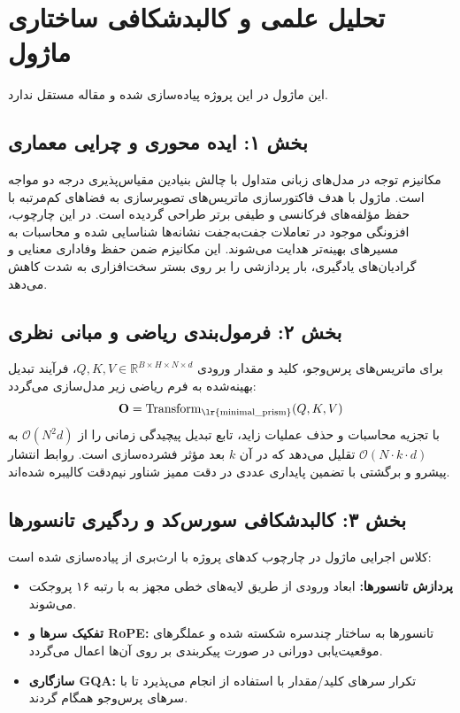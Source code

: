 \section{تحلیل علمی و کالبدشکافی ساختاری ماژول }

این ماژول در این پروژه پیاده‌سازی شده و مقاله مستقل ندارد.
\label{sec:minimal_prism}

\subsection*{بخش ۱: ایده محوری و چرایی معماری }
مکانیزم توجه در مدل‌های زبانی متداول با چالش بنیادین مقیاس‌پذیری درجه دو مواجه است. ماژول  با هدف فاکتورسازی ماتریس‌های تصویرسازی به فضاهای کم‌مرتبه با حفظ مؤلفه‌های فرکانسی و طیفی برتر طراحی گردیده است. در این چارچوب، افزونگی موجود در تعاملات جفت‌به‌جفت نشانه‌ها شناسایی شده و محاسبات به مسیرهای بهینه‌تر هدایت می‌شوند. این مکانیزم ضمن حفظ وفاداری معنایی و گرادیان‌های یادگیری، بار پردازشی را بر روی بستر سخت‌افزاری به شدت کاهش می‌دهد.

\subsection*{بخش ۲: فرمول‌بندی ریاضی و مبانی نظری }
برای ماتریس‌های پرس‌وجو، کلید و مقدار ورودی $Q, K, V \in \mathbb{R}^{B \times H \times N \times d}$، فرآیند تبدیل بهینه‌شده به فرم ریاضی زیر مدل‌سازی می‌گردد:
\begin{equation}
\mathbf{O} = \operatorname{Transform}_{\text{\lr{minimal\_prism}}}(Q, K, V)
\end{equation}
با تجزیه محاسبات و حذف عملیات زاید، تابع تبدیل پیچیدگی زمانی را از $\mathcal{O}(N^2 d)$ به $\mathcal{O}(N \cdot k \cdot d)$ تقلیل می‌دهد که در آن $k$ بعد مؤثر فشرده‌سازی است. روابط انتشار پیشرو و برگشتی با تضمین پایداری عددی در دقت ممیز شناور نیم‌دقت  کالیبره شده‌اند.

\subsection*{بخش ۳: کالبدشکافی سورس‌کد و ردگیری تانسورها }
کلاس اجرایی ماژول در چارچوب کدهای پروژه با ارث‌بری از  پیاده‌سازی شده است:
\begin{itemize}
    \item \textbf{پردازش تانسورها:} ابعاد ورودی \lr{$[B, N, D]$} از طریق لایه‌های خطی مجهز به  با رتبه ۱۶ پروجکت می‌شوند.
    \item \textbf{تفکیک سرها و RoPE:} تانسورها به ساختار چندسره \lr{$[B, H, N, d]$} شکسته شده و عملگرهای موقعیت‌یابی دورانی در صورت پیکربندی بر روی آن‌ها اعمال می‌گردد.
    \item \textbf{سازگاری GQA:} تکرار سرهای کلید/مقدار با استفاده از  انجام می‌پذیرد تا با سرهای پرس‌وجو همگام گردند.
\end{itemize}


